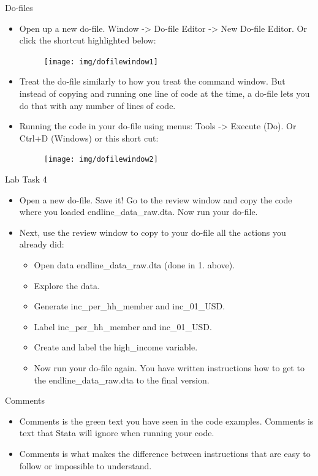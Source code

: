 \documentclass[aspectratio=169]{beamer}
\begin{document}
\begin{frame}{Do-files}
\begin{itemize}
	\item Open up a new do-file. Window -> Do-file Editor -> New Do-file Editor. Or click the shortcut highlighted below:
		\begin{figure}
			\centering
			\texttt{[image: img/dofilewindow1]}
		\end{figure}
	\item Treat the do-file similarly to how you treat the command window. But instead of copying and running one line of code at the time, a do-file lets you do that with any number of lines of code.
	\item Running the code in your do-file using menus: Tools -> Execute (Do). Or Ctrl+D (Windows) or this short cut:
	\begin{figure}
		\centering
		\texttt{[image: img/dofilewindow2]}
	\end{figure}
\end{itemize}
\end{frame}

\begin{frame}{Lab Task 4}
\begin{itemize}
	\item Open a new do-file. Save it! Go to the review window and copy the code where you loaded endline\_data\_raw.dta. Now run your do-file.
	\item Next, use the review window to copy to your do-file all the actions you already did:
		\begin{itemize}
			\item Open data endline\_data\_raw.dta (done in 1. above).
			\item Explore the data.
			\item Generate inc\_per\_hh\_member and inc\_01\_USD.
			\item Label inc\_per\_hh\_member and inc\_01\_USD.
			\item Create and label the high\_income variable.
			\item Now run your do-file again. You have written instructions how to get to the endline\_data\_raw.dta to the final version.
		\end{itemize}
\end{itemize}
\end{frame}

\begin{frame}{Comments}
\begin{itemize}
	\item Comments is the green text you have seen in the code examples. Comments is text that Stata will ignore when running your code.
	\item Comments is what makes the difference between instructions that are easy to follow or impossible to understand.
\end{itemize}
\end{frame}
\end{document}
